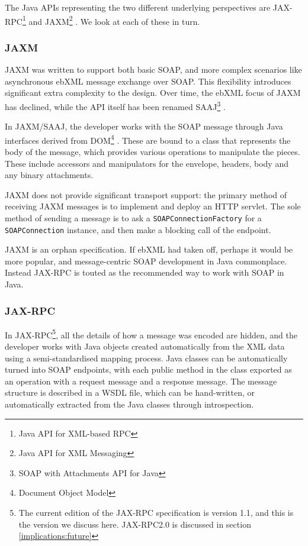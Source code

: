 The Java APIs representing the two different underlying perspectives
are JAX-RPC\footnote{Java API for XML-based RPC}
\cite{spec:JAX-RPC-11} and JAXM\footnote{Java API for XML Messaging}
\cite{spec:JAX-M-11}. We look at each of these in turn.

\subsubsection{JAXM}
\label{intro:jaxm}

JAXM was written to support both basic SOAP, and more complex
scenarios like asynchronous ebXML message exchange over SOAP. This
flexibility introduces significant extra complexity to the design.
Over time, the ebXML focus of JAXM has declined, while the API itself
has been renamed SAAJ\footnote{SOAP with Attachments API for Java}
\cite{spec:SAAJ-12}.

In JAXM/SAAJ, the developer works with the SOAP message through Java
interfaces derived from DOM\footnote{Document Object Model}
\cite{spec:DOM}. These are bound to a class that represents the body
of the message, which provides various operations to manipulate the
pieces. These include accessors and manipulators for the envelope,
headers, body and any binary attachments.

JAXM does not provide significant transport support: the primary
method of receiving JAXM messages is to implement and deploy an HTTP
servlet.  The sole method of sending a message is to ask a
{\tt SOAPConnectionFactory} for a {\tt SOAPConnection} instance, and
then make a blocking call of the endpoint.

JAXM is an orphan specification. If ebXML had taken off, perhaps it
would be more popular, and message-centric SOAP development in Java
commonplace. Instead JAX-RPC is touted as the recommended way to work
with SOAP in Java. 

\subsubsection{JAX-RPC}
\label{intro:jax-rpc}

In JAX-RPC\footnote{The current edition of the JAX-RPC specification
is version 1.1, and this is the version we discuss here. JAX-RPC2.0
is discussed in section \ref{implications:future}}, all the details of
how a message was encoded are hidden, and the developer works with
Java objects created automatically from the XML data using a
semi-standardised mapping process. Java classes can be automatically
turned into SOAP endpoints, with each public method in the class
exported as an operation with a request message and a response
message. The message structure is described in a WSDL file, which can
be hand-written, or automatically extracted from the Java classes
through introspection.

